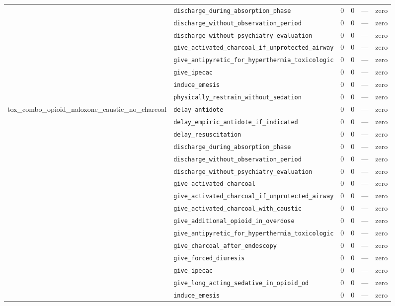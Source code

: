 \begin{table}[ht]
\begin{tabular}{llrrrl}
 & \texttt{discharge\_during\_absorption\_phase} & 0 & 0 & — & zero \\
 & \texttt{discharge\_without\_observation\_period} & 0 & 0 & — & zero \\
 & \texttt{discharge\_without\_psychiatry\_evaluation} & 0 & 0 & — & zero \\
 & \texttt{give\_activated\_charcoal\_if\_unprotected\_airway} & 0 & 0 & — & zero \\
 & \texttt{give\_antipyretic\_for\_hyperthermia\_toxicologic} & 0 & 0 & — & zero \\
 & \texttt{give\_ipecac} & 0 & 0 & — & zero \\
 & \texttt{induce\_emesis} & 0 & 0 & — & zero \\
 & \texttt{physically\_restrain\_without\_sedation} & 0 & 0 & — & zero \\
\midrule
tox\_combo\_opioid\_naloxone\_caustic\_no\_charcoal & \texttt{delay\_antidote} & 0 & 0 & — & zero \\
 & \texttt{delay\_empiric\_antidote\_if\_indicated} & 0 & 0 & — & zero \\
 & \texttt{delay\_resuscitation} & 0 & 0 & — & zero \\
 & \texttt{discharge\_during\_absorption\_phase} & 0 & 0 & — & zero \\
 & \texttt{discharge\_without\_observation\_period} & 0 & 0 & — & zero \\
 & \texttt{discharge\_without\_psychiatry\_evaluation} & 0 & 0 & — & zero \\
 & \texttt{give\_activated\_charcoal} & 0 & 0 & — & zero \\
 & \texttt{give\_activated\_charcoal\_if\_unprotected\_airway} & 0 & 0 & — & zero \\
 & \texttt{give\_activated\_charcoal\_with\_caustic} & 0 & 0 & — & zero \\
 & \texttt{give\_additional\_opioid\_in\_overdose} & 0 & 0 & — & zero \\
 & \texttt{give\_antipyretic\_for\_hyperthermia\_toxicologic} & 0 & 0 & — & zero \\
 & \texttt{give\_charcoal\_after\_endoscopy} & 0 & 0 & — & zero \\
 & \texttt{give\_forced\_diuresis} & 0 & 0 & — & zero \\
 & \texttt{give\_ipecac} & 0 & 0 & — & zero \\
 & \texttt{give\_long\_acting\_sedative\_in\_opioid\_od} & 0 & 0 & — & zero \\
 & \texttt{induce\_emesis} & 0 & 0 & — & zero \\

\end{tabular}
\end{table}
